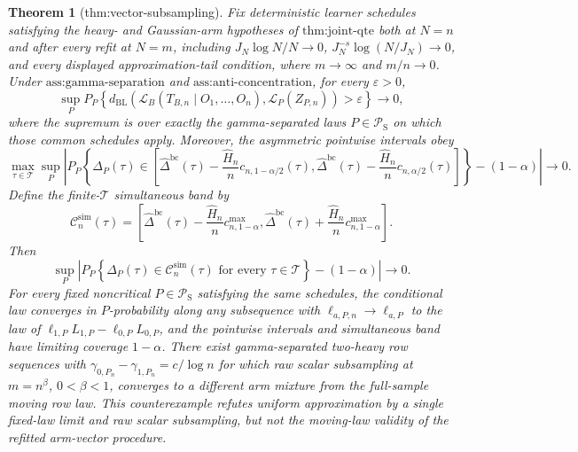 \documentclass{article}
\newtheorem{theorem}{Theorem}
\begin{document}
\begin{theorem}[thm:vector-subsampling]\label{thm:vector-subsampling}
Fix deterministic learner schedules satisfying the heavy- and Gaussian-arm hypotheses of \(\text{thm:joint-qte}\) both at \(N=n\) and after every refit at \(N=m\), including \(J_N\log N/N\to0\), \(J_N^{-s}\log(N/J_N)\to0\), and every displayed approximation-tail condition, where \(m\to\infty\) and \(m/n\to0\). Under \(\text{ass:gamma-separation}\) and \(\text{ass:anti-concentration}\), for every \(\varepsilon>0\),
\[
\sup_P P_P\!\left\{
d_{\mathrm{BL}}\!\left(
\mathcal L_B(T_{B,n}\mid O_1,\ldots,O_n),
\mathcal L_P(Z_{P,n})\right)>\varepsilon\right\}\longrightarrow0,
\]
where the supremum is over exactly the gamma-separated laws \(P\in\mathcal P_{\mathrm S}\) on which those common schedules apply. Moreover, the asymmetric pointwise intervals obey
\[
\max_{\tau\in\mathcal T}\sup_P\left|
P_P\!\left\{\Delta_P(\tau)\in
\left[
\widehat\Delta^{\mathrm{bc}}(\tau)-\frac{\widehat H_n}{n}c_{n,1-\alpha/2}(\tau),
\widehat\Delta^{\mathrm{bc}}(\tau)-\frac{\widehat H_n}{n}c_{n,\alpha/2}(\tau)
\right]\right\}-(1-\alpha)\right|\longrightarrow0.
\]
Define the finite-\(\mathcal T\) simultaneous band by
\[
\mathcal C_n^{\mathrm{sim}}(\tau)=
\left[
\widehat\Delta^{\mathrm{bc}}(\tau)-\frac{\widehat H_n}{n}c^{\max}_{n,1-\alpha},
\widehat\Delta^{\mathrm{bc}}(\tau)+\frac{\widehat H_n}{n}c^{\max}_{n,1-\alpha}
\right].
\]
Then
\[
\sup_P\left|
P_P\!\left\{\Delta_P(\tau)\in\mathcal C_n^{\mathrm{sim}}(\tau)
\text{ for every }\tau\in\mathcal T\right\}-(1-\alpha)
\right|\longrightarrow0.
\]
For every fixed noncritical \(P\in\mathcal P_{\mathrm S}\) satisfying the same schedules, the conditional law converges in \(P\)-probability along any subsequence with \(\ell_{a,P,n}\to\ell_{a,P}\) to the law of \(\ell_{1,P}L_{1,P}-\ell_{0,P}L_{0,P}\), and the pointwise intervals and simultaneous band have limiting coverage \(1-\alpha\). There exist gamma-separated two-heavy row sequences with \(\gamma_{0,P_n}-\gamma_{1,P_n}=c/\log n\) for which raw scalar subsampling at \(m=n^\beta\), \(0<\beta<1\), converges to a different arm mixture from the full-sample moving row law. This counterexample refutes uniform approximation by a single fixed-law limit and raw scalar subsampling, but not the moving-law validity of the refitted arm-vector procedure.
\end{theorem}
\end{document}
